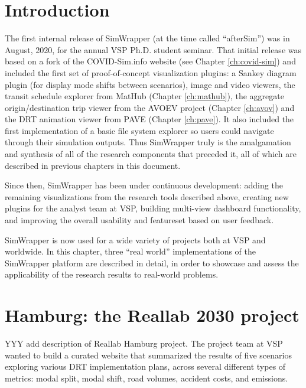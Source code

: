 \section{Introduction}
\label{sites-intro}

The first internal release of SimWrapper (at the time called ``afterSim'') was in August, 2020, for the annual VSP Ph.D. student seminar. That initial release was based on a fork of the COVID-Sim.info website (see Chapter \ref{ch:covid-sim}) and included the first set of proof-of-concept visualization plugins: a Sankey diagram plugin (for display mode shifts between scenarios), image and video viewers, the transit schedule explorer from MatHub (Chapter \ref{ch:mathub}), the aggregate origin/destination trip viewer from the AVOEV project (Chapter \ref{ch:avov}) and the \gls{DRT} animation viewer from PAVE (Chapter \ref{ch:pave}). It also included the first implementation of a basic file system explorer so users could navigate through their simulation outputs. Thus SimWrapper truly is the amalgamation and synthesis of all of the research components that preceded it, all of which are described in previous chapters in this document.

Since then, SimWrapper has been under continuous development: adding the remaining visualizations from the research tools described above, creating new plugins for the analyst team at VSP, building multi-view dashboard functionality, and improving the overall usability and featureset based on user feedback.

SimWrapper is now used for a wide variety of projects both at VSP and worldwide. In this chapter, three ``real world'' implementations of the SimWrapper platform are described in detail, in order to showcase and assess the applicability of the research results to real-world problems.

\section{Hamburg: the Reallab 2030 project}
\label{sites-hamburg}

YYY add description of Reallab Hamburg project. The project team at VSP wanted to build a curated website that summarized the results of five scenarios exploring various \gls{DRT} implementation plans, across several different types of metrics: modal split, modal shift, road volumes, accident costs, and emissions.

